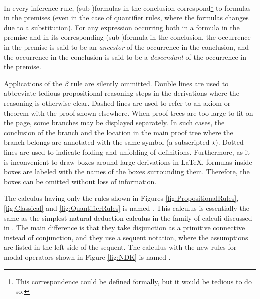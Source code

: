 \documentclass[smallextended]{svjour3}
\begin{document}
In every inference rule, (sub-)formulas in the conclusion correspond\footnote{This correspondence could be defined formally, but it would be tedious to do so.} to formulas in the premises (even in the case of quantifier rules, where the formulas changes due to a substitution). For any expression occurring both in a formula in the premise and in its corresponding (sub-)formula in the conclusion, the occurrence in the premise is said to be an \emph{ancestor} of the occurrence in the conclusion, and the occurrence in the conclusion is said to be a \emph{descendant} of the occurrence in the premise.


\newcommand{\subproof}{\star}

Applications of the $\beta$ rule are silently ommitted. Double lines are used to abbreviate tedious propositional reasoning steps in the derivations where the reasoning is otherwise clear. Dashed lines are used to refer to an axiom or theorem with the proof shown elsewhere. When proof trees are too large to fit on the page, some branches may be displayed separately. In such cases, the conclusion of the branch and the location in the main proof tree where the branch belongs are annotated with the same symbol (a subscripted $\subproof$). Dotted lines are used to indicate folding and unfolding of definitions. Furthermore, as it is inconvenient to draw boxes around large derivations in \LaTeX, formulas inside boxes are labeled with the names of the boxes surrounding them. Therefore, the boxes can be omitted without loss of information. 

The calculus having only the rules shown in Figures \ref{fig:PropositionalRules}, \ref{fig:Classical} and \ref{fig:QuantifierRules} is named \ND. This calculus is essentially the same as the simplest natural deduction calculus in the family of calculi discussed in \citep{BenzmuellerBrownKohlhase}. The main difference is that they take disjunction as a primitive connective instead of conjunction, and they use a sequent notation, where the assumptions are listed in the left side of the sequent. The calculus with the new rules for modal operators shown in Figure \ref{fig:NDK} is named \NDK.

\newcommand{\s}{\qquad}
\end{document}
